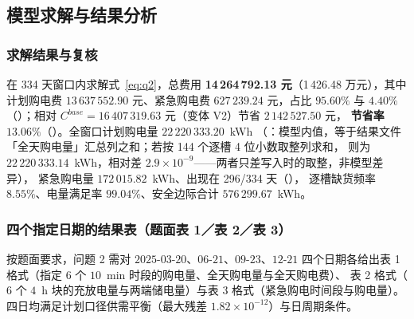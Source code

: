 \subsection{模型求解与结果分析}

\subsubsection{求解结果与复核}\label{sec:q2-results}
在 334 天窗口内求解式~\eqref{eq:q2}，总费用 \textbf{14\,264\,792.13 元}（1\,426.48 万元），其中
计划购电费 \(13\,637\,552.90\) 元、紧急购电费 \(627\,239.24\) 元，占比 \(95.60\%\) 与 \(4.40\%\)
（）；相对 \(C^{base}=16\,407\,319.63\) 元（变体 V2）节省 \(2\,142\,527.50\) 元，
\textbf{节省率 \(13.06\%\)}（）。全窗口计划购电量 \(22\,220\,333.20\)~kWh
（：模型内值，等于结果文件「全天购电量」汇总列之和；若按 144 个逐槽 4 位小数取整列求和，
则为 \(22\,220\,333.14\)~kWh，相对差 \(2.9\times10^{-9}\)——两者只差写入时的取整，非模型差异），
紧急购电量 \(172\,015.82\)~kWh、出现在 296/334 天（），
逐槽缺货频率 \(8.55\%\)、电量满足率 \(99.04\%\)、安全边际合计 \(576\,299.67\)~kWh。

\subsubsection{四个指定日期的结果表（题面表 1／表 2／表 3）}

按题面要求，问题 2 需对 \(2025\text{-}03\text{-}20\)、\(06\text{-}21\)、\(09\text{-}23\)、\(12\text{-}21\)
四个日期各给出表 1 格式（指定 \(6\) 个 \(10\)~min 时段的购电量、全天购电量与全天购电费）、
表 2 格式（\(6\) 个 \(4\)~h 块的充放电量与两端储电量）与表 3 格式（紧急购电时间段与购电量）。
四日均满足计划口径供需平衡（最大残差 \(1.82\times10^{-12}\)）与日周期条件。

